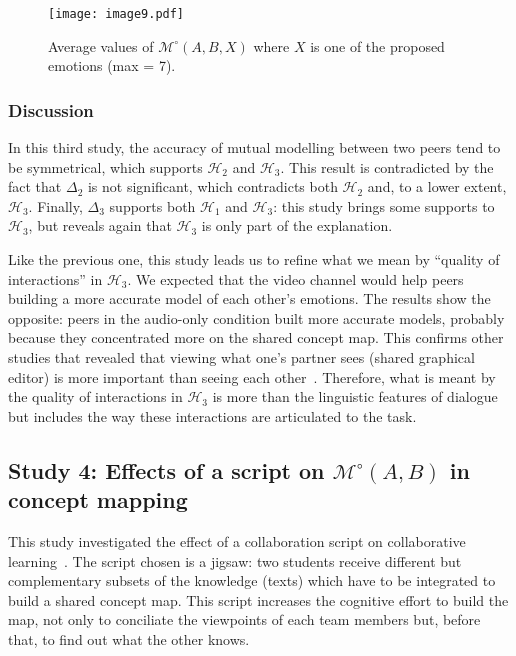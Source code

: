\documentclass[natbib]{svjour3}
\newcommand{\Model}[3]{{$\mathcal{M}^{\circ}(#1, #2, #3)$}}
\newcommand{\gModel}[2]{{$\mathcal{M}^{\circ}(#1, #2)$}}
\begin{document}
\begin{figure}[ht!]
        \centering
        \texttt{[image: image9.pdf]}
        \caption{Average values of \Model{A}{B}{X} where $X$ is one of the proposed
        emotions (max = 7).}
        \label{study3:deg_m_values}
\end{figure}



\subsubsection*{Discussion} 

In this third study, the accuracy of mutual modelling  between two peers tend to
be symmetrical, which  supports $\mathcal{H}_{2}$ and $\mathcal{H}_{3}$. This
result is contradicted by the fact that $\Delta_2$ is not significant, which
contradicts both $\mathcal{H}_{2}$ and, to a lower extent, $\mathcal{H}_{3}$.
Finally, $\Delta_3$ supports both $\mathcal{H}_{1}$ and  $\mathcal{H}_{3}$: this
study brings some supports to  $\mathcal{H}_{3}$, but reveals again that
$\mathcal{H}_{3}$ is only part of the explanation.

Like the previous one, this study leads us to refine what we mean by ``quality
of interactions'' in $\mathcal{H}_{3}$. We  expected that the video channel
would help peers building a more accurate model of each other's emotions. The
results show the opposite: peers in the audio-only condition built more accurate
models, probably because they concentrated more on the shared concept map. This
confirms other studies that revealed that viewing what one's partner sees
(shared graphical editor) is more important than seeing each
other~\citep{gaver1993one,anderson1997impact}. Therefore, what is meant by the
quality of interactions in $\mathcal{H}_{3}$ is more than the linguistic
features of dialogue but includes the way these interactions are articulated to
the task.


\subsection{{\bf Study 4}:  Effects of a script on \gModel{A}{B}  in concept mapping}

This study investigated the effect of a collaboration script on collaborative
learning~\citep{molinari2008effects}. The script chosen is a
{\sc jigsaw}: two students receive different but complementary subsets of the
knowledge (texts) which have to be integrated to build a shared concept map.
This script increases the cognitive effort to build the map, not only to
conciliate the viewpoints of each team members but, before that, to find out
what the other knows. 
\end{document}

